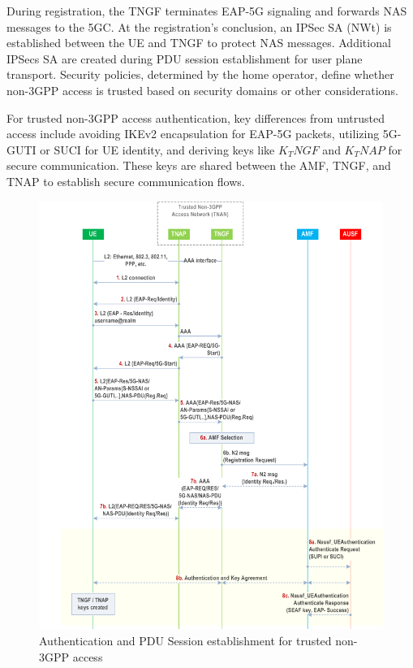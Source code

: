 During registration, the \ac{TNGF} terminates \ac{EAP-5G} signaling and forwards \ac{NAS} messages to the \ac{5GC}. At the registration's conclusion, an \ac{IPSec} SA (NWt) is established between the \ac{UE} and \ac{TNGF} to protect \ac{NAS} messages. Additional \acp{IPSec} SA are created during \ac{PDU} session establishment for user plane transport. Security policies, determined by the home operator, define whether non-\ac{3GPP} access is trusted based on security domains or other considerations.

For trusted non-\ac{3GPP} access authentication, key differences from untrusted access include avoiding \ac{IKEv2} encapsulation for \ac{EAP-5G} packets, utilizing \ac{5G-GUTI} or \ac{SUCI} for \ac{UE} identity, and deriving keys like $K_TNGF$ and $K_TNAP$ for secure communication. These keys are shared between the \ac{AMF}, \ac{TNGF}, and \ac{TNAP} to establish secure communication flows.

\begin{figure}
    \centering
    \includegraphics[width=0.75\linewidth]{figs/Authentication and PDU Session establishment for trusted non-3GPP access_1.png}
    \caption{Authentication and \ac{PDU} Session establishment for trusted non-\ac{3GPP} access}
    \label{fig:Authentication and PDU Session establishment for trusted non-3GPP access_1}
\end{figure}

